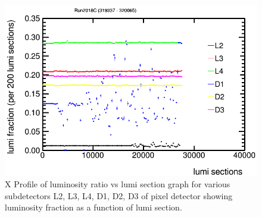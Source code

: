 \begin{figure}[H]
  \centering
  \includegraphics[width=0.5\columnwidth]{./ProfileXcombinedC_new.png}
  \caption{X Profile of luminosity ratio vs lumi section graph for various subdetectors L2, L3, L4, D1, D2, D3 of pixel detector showing luminosity fraction as a function of lumi section. \cite{lumidpg}}
  \label{fig:CMS}
\end{figure}

